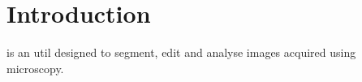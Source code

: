 \section{Introduction}

\espina is an util designed to segment, edit and analyse images acquired using microscopy.
